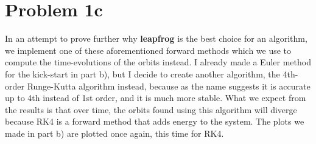 
\section*{Problem 1c}

In an attempt to prove further why \textbf{leapfrog} is the best choice for an algorithm, we implement one of these aforementioned forward methods which we use to compute the time-evolutions of the orbits instead. I already made a Euler method for the kick-start in part b), but I decide to create another algorithm, the 4th-order Runge-Kutta algorithm instead, because as the name suggests it is accurate up to 4th instead of 1st order, and it is much more stable. What we expect from the results is that over time, the orbits found using this algorithm will diverge because RK4 is a forward method that adds energy to the system. The plots we made in part b) are plotted once again, this time for RK4. 


















